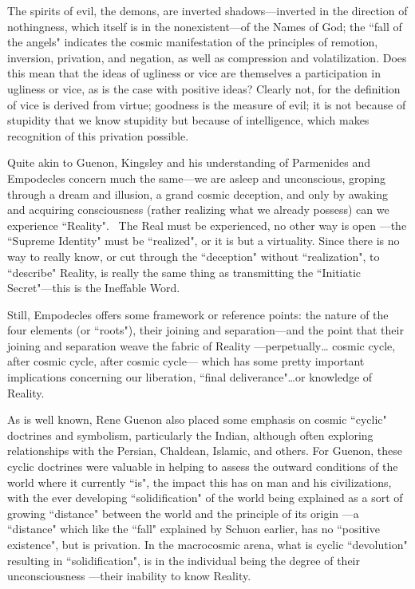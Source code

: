 \begin{quotex}
The spirits of evil, the demons, are inverted shadows—inverted in the direction of nothingness, which itself is in the nonexistent—of the Names of God; the ``fall of the angels" indicates the cosmic manifestation of the principles of remotion, inversion, privation, and negation, as well as compression and volatilization. Does this mean that the ideas of ugliness or vice are themselves a participation in ugliness or vice, as is the case with positive ideas? Clearly not, for the definition of vice is derived from virtue; goodness is the measure of evil; it is not because of stupidity that we know stupidity but because of intelligence, which makes recognition of this privation possible. 

\end{quotex}
Quite akin to Guenon, Kingsley and his understanding of Parmenides and Empodecles concern much the same—we are asleep and unconscious, groping through a dream and illusion, a grand cosmic deception, and only by awaking and acquiring consciousness (rather realizing what we already possess) can we experience ``Reality".  The Real must be experienced, no other way is open —the ``Supreme Identity" must be ``realized", or it is but a virtuality. Since there is no way to really know, or cut through the ``deception" without ``realization", to ``describe" Reality, is really the same thing as transmitting the ``Initiatic Secret"—this is the Ineffable Word.

Still, Empodecles offers some framework or reference points: the nature of the four elements (or ``roots"), their joining and separation—and the point that their joining and separation weave the fabric of Reality —perpetually… cosmic cycle, after cosmic cycle, after cosmic cycle— which has some pretty important implications concerning our liberation, ``final deliverance"…or knowledge of Reality.

As is well known, Rene Guenon also placed some emphasis on cosmic ``cyclic" doctrines and symbolism, particularly the Indian, although often exploring relationships with the Persian, Chaldean, Islamic, and others. For Guenon, these cyclic doctrines were valuable in helping to assess the outward conditions of the world where it currently ``is", the impact this has on man and his civilizations, with the ever developing ``solidification" of the world being explained as a sort of growing ``distance" between the world and the principle of its origin —a ``distance" which like the ``fall" explained by Schuon earlier, has no ``positive existence", but is privation. In the macrocosmic arena, what is cyclic ``devolution" resulting in ``solidification", is in the individual being the degree of their unconsciousness —their inability to know Reality.

